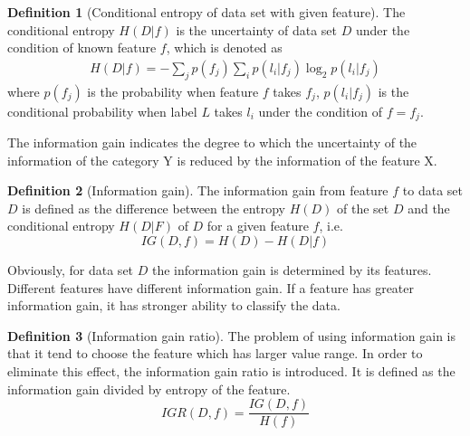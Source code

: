 \documentclass{ieeeaccess}
\theoremstyle{definition}
\newtheorem{defn}{Definition}
\begin{document}
\begin{defn}[Conditional entropy of data set with given feature]
The conditional entropy $H(D|f)$ is the uncertainty of data set $D$ under the condition of known feature $f$, which is denoted as
\begin{align}
     H(D|f)=-\sum_{j} p(f_j) \sum_{i} p(l_i|f_j) \log_2 p(l_i|f_j)
\end{align}
where $p(f_j)$ is the probability when feature $f$ takes $f_j$, $p(l_i|f_j)$ is the conditional probability when label $L$ takes $l_i$ under the condition of $f=f_j$.
\end{defn}

The information gain indicates the degree to which the uncertainty of the information of the category Y is reduced by the information of the feature X.

\begin{defn}[Information gain]
    The information gain from feature $f$ to data set $D$ is defined as the difference between the entropy $H(D)$ of the set $D$ and the conditional entropy $H(D|F)$ of $D$ for a given feature $f$, i.e.
\begin{equation}
    IG(D, f) = H(D) - H(D|f)
\end{equation}
\end{defn}

Obviously, for data set $D$ the information gain is determined by its features. Different features have different information gain. If a feature has greater information gain, it has stronger ability to classify the data.

\begin{defn}[Information gain ratio]
The problem of using information gain is that it tend to choose the feature which has larger value range. In order to eliminate this effect, the information gain ratio is introduced. It is defined as the information gain divided by entropy of the feature.
\begin{equation}
    IGR(D, f) = \frac{IG(D, f)}{H(f)}
\end{equation}
\end{defn}
\end{document}
